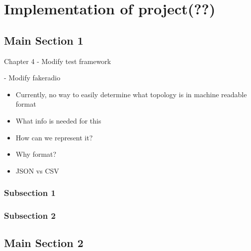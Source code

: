 
\chapter{Implementation of project(??)} %

\label{Chapter4} %


\section{Main Section 1}
Chapter 4
- Modify test framework

- Modify fakeradio


\begin{itemize}
    \item Currently, no way to easily determine what topology is in machine readable format
    \item What info is needed for this 
    \item How can we represent it?
    \item Why format?
    \item JSON vs CSV
    
\end{itemize}


\subsection{Subsection 1}




\subsection{Subsection 2}



\section{Main Section 2}
